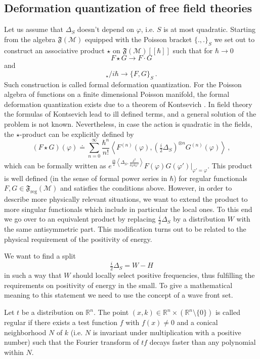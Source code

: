 \documentclass[11pt]{article}
\newcommand{\F}{\mathfrak{F}}
\newcommand{\Mcal}{\mathcal{M}}
\newcommand{\reg}{\mathrm{reg}}
\newcommand{\ph}{\varphi}
\newcommand{\Poi}[2]{\{#1,#2\}}
\newcommand{\1}{\mathds{1}}                         %
\newcommand{\be}{\begin{equation}}
\newcommand{\ee}{\end{equation}}
\begin{document}
{\subsection{Deformation quantization of free field theories}\label{deformation}
Let us assume that $\Delta_S$ doesn't depend on $\ph$, i.e. $S$ is at most quadratic. Starting from the algebra $\mathfrak{F}(\Mcal)$ equipped with the Poisson bracket $\Poi{.}{.}_S$ we set out to construct an associative product $\star$ on $\mathfrak{F}(\Mcal)[[\hbar]]$ such that for $\hbar\to0$
\be
F\star G\to F\cdot G 
\ee 
and
\be
[F,G]_{\star}/i\hbar\to \Poi{F}{G}_S \ .
\ee
Such construction is called formal deformation quantization. For the Poisson algebra of functions on a finite dimensional Poisson manifold, the formal deformation quantization exists  due to a theorem of Kontsevich \cite{Kon}. 
In field theory the formulas of Kontsevich lead to ill defined terms, and a general solution of the problem is not known. Nevertheless, in case the action is quadratic in the fields, the $\star$-product can be explicitly defined by
\be
(F\star G)(\ph)\doteq\sum\limits_{n=0}^\infty \frac{\hbar^n}{n!}\left<F^{(n)}(\ph),\left(\tfrac{i}{2}\Delta_S\right)^{\otimes n}G^{(n)}(\ph)\right>\,,
\ee 
which can be formally written as $e^{\frac{i\hbar}{2}\left\langle\Delta_S,\frac{\delta^2}{\delta\ph\delta\ph'}\right\rangle}F(\ph)G(\ph')|_{\ph'=\ph}$.
This product is well defined (in the sense of formal power series in $\hbar$) for regular functionals $F,G\in\F_\reg(\Mcal)$ and satisfies the conditions above. However, in order to describe more physically relevant situations, we want to extend the product to more singular functionals which include in particular the local ones. To this end we go over to an equivalent product by replacing $\frac{i}{2}\Delta_S$ by a distribution $W$ with the same antisymmetric part. This modification turns out to be related to the physical requirement of the positivity of energy. 

We want to find a split
\be
\tfrac{i}{2}\Delta_S=W-H
\ee
in such a way that $W$ should locally select positive frequencies, thus fulfilling the requirements on positivity of energy in the small. To give a mathematical meaning to this statement we need to use the concept of a wave front set.
{\begin{df}\label{WFset}
Let $t$ be a distribution on $\mathbb R^n$. The point $(x,k)\in\mathbb R^n\times(\mathbb R^n\setminus\{0\})$ is called regular if there exists a test function $f$ with $f(x)\neq0$ and a conical neighborhood $N$ of $k$ (i.e. $N$ is invariant under multiplication with a positive number) such that the Fourier transform of $tf$ decays faster than any polynomial within $N$. 


\end{df}}}
\end{document}
